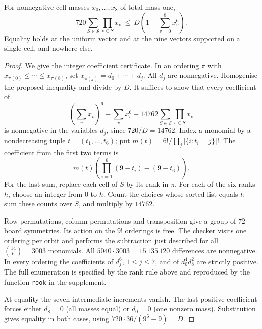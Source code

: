 \begin{lemma}\label{lem:rook}
For nonnegative cell masses \(x_0,\ldots,x_8\) of total mass one,
\[
 720\sum_{S\in\mathcal S}\prod_{v\in S}x_v
 \ \le\ D\left(1-\sum_{v=0}^{8}x_v^6\right).
\]
Equality holds at the uniform vector and at the nine vectors supported
on a single cell, and nowhere else.
\end{lemma}

\begin{proof}
We give the integer coefficient certificate. In an ordering \(\pi\) with
\(x_{\pi(0)}\le\cdots\le x_{\pi(8)}\), set
\(x_{\pi(j)}=d_0+\cdots+d_j\). All \(d_j\) are nonnegative.
Homogenise the proposed inequality and divide by \(D\). It suffices
to show that every coefficient of
\[
 \left(\sum_v x_v\right)^6-\sum_v x_v^6
       -14762\sum_{S\in\mathcal S}\prod_{v\in S}x_v
\]
is nonnegative in the variables \(d_j\), since \(720/D=14762\).
Index a monomial by a nondecreasing tuple \(t=(t_1,\ldots,t_6)\);
put \(m(t)=6!/\prod_j |\{i:t_i=j\}|!\).
The coefficient from the first two terms is
\[
 m(t)\left(\prod_{i=1}^6(9-t_i)-(9-t_6)\right).
\]
For the last sum, replace each cell of \(S\) by its rank in \(\pi\).
For each of the six ranks \(h\), choose an integer from \(0\) to \(h\).
Count the choices whose sorted list equals \(t\); sum these counts
over \(S\), and multiply by \(14762\).

Row permutations, column permutations and transposition give a group
of \(72\) board symmetries. Its action on the \(9!\) orderings is free.
The checker visits one ordering per orbit and performs the subtraction
just described for all \(\binom{14}6=3003\) monomials. All
\(5040\cdot3003=15\,135\,120\) differences are nonnegative. In every
ordering the coefficients of \(d_j^6\), \(1\le j\le7\), and of
\(d_0^4d_8^2\) are strictly positive. The full enumeration is specified
by the rank rule above and reproduced by the function
\texttt{rook} in the supplement.

At equality the seven intermediate increments vanish. The last positive
coefficient forces either \(d_8=0\) (all masses equal) or \(d_0=0\)
(one nonzero mass). Substitution gives equality in both cases, using
\(720\cdot36/(9^6-9)=D\).
\end{proof}

